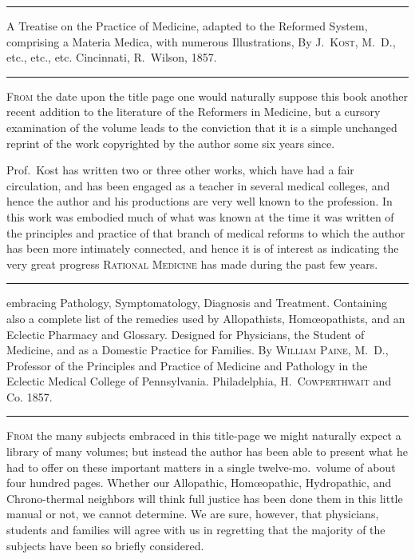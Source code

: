 
\fancybreak{* * *}

\footnotesize
{}  A Treatise on the Practice of Medicine, adapted to the Reformed
System, comprising a Materia Medica, with numerous Illustrations, By \textsc{J.~Kost, M.~D.}, etc., etc., etc. Cincinnati, R.~Wilson, 1857.
\plainbreak{1}
\normalsize

\lettrine[lines=1]{}{From} the date upon the title page one would naturally suppose this
book another recent addition to the literature of the Reformers in Medicine,
but a cursory examination of the volume leads to the conviction
that it is a simple unchanged reprint of the work copyrighted by the
author some six years since.

Prof.\ Kost has written two or three other works, which have had
a fair circulation, and has been engaged as a teacher in several
medical colleges, and hence the author and his productions are very
well known to the profession. In this work was embodied much of what
was known at the time it was written of the principles and practice of
that branch of medical reforms to which the author has been more intimately
connected, and hence it is of interest as indicating the very
great progress \textsc{Rational Medicine} has made during the past few years.

\fancybreak{* * *}

\footnotesize
{} embracing Pathology, Symptomatology,
Diagnosis and Treatment. Containing also a complete list of the remedies used
by Allopathists, Homœopathists, and an Eclectic Pharmacy and Glossary. Designed
for Physicians, the Student of Medicine, and as a Domestic Practice for Families. By
\textsc{William Paine}, M.~D., Professor of the Principles and Practice of Medicine and Pathology
in the Eclectic Medical College of Pennsylvania. Philadelphia, \textsc{H.~Cowperthwait}
and Co. 1857.
\plainbreak{1}
\normalsize

\lettrine[lines=1]{}{From} the many subjects embraced in this title-page we might naturally
expect a library of many volumes; but instead the author has been
able to present what he had to offer on these important matters in a
single twelve-mo.\ volume of about four hundred pages. Whether our
Allopathic, Homœopathic, Hydropathic, and Chrono-thermal neighbors
will think full justice has been done them in this little manual or not,
we cannot determine. We are sure, however, that physicians, students
and families will agree with us in regretting that the majority of the
subjects have been so briefly considered.

